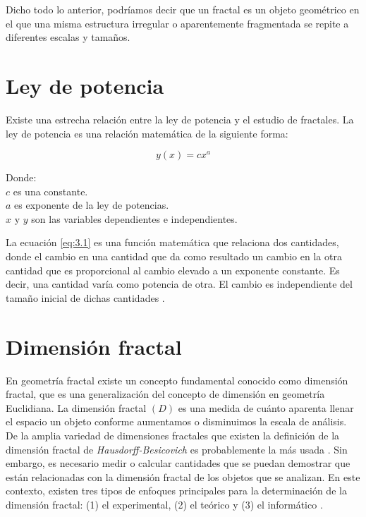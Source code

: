 Dicho todo lo anterior, podr\'{i}amos decir que un fractal es un objeto geom\'{e}trico en el que una misma estructura irregular o aparentemente fragmentada se repite a diferentes escalas y tamaños. 

\section{Ley de potencia} 

Existe una estrecha relaci\'{o}n entre la ley de potencia y el estudio de fractales. La ley de potencia es una relaci\'{o}n matem\'{a}tica de la siguiente forma:

\begin{equation}
	y(x) = cx^{a}
	\label{eq:3.1}
\end{equation}

Donde:\\
$c$ es una constante.\\
$a$ es exponente de la ley de potencias.\\
$x$ y $y$ son las variables dependientes e independientes. 

La ecuaci\'{o}n \ref{eq:3.1} es una funci\'{o}n matem\'{a}tica que relaciona dos cantidades, donde el cambio en una cantidad que da como resultado un cambio en la otra cantidad que es proporcional al cambio elevado a un exponente constante. Es decir, una cantidad var\'{i}a como potencia de otra. El cambio es independiente del tamaño inicial de dichas cantidades \cite{Meakin1998}.

\color{blue}

\section{Dimensi\'{o}n fractal}

En geometr\'{i}a fractal existe un concepto fundamental conocido como dimensi\'{o}n fractal, que es una generalizaci\'{o}n del concepto de dimensi\'{o}n en geometr\'{i}a Euclidiana. La dimensi\'{o}n fractal $(D)$ es una medida de cu\'{a}nto aparenta llenar el espacio un objeto conforme aumentamos o disminuimos la escala de an\'{a}lisis. De la  amplia variedad de dimensiones fractales que existen la definici\'{o}n de la dimensi\'{o}n fractal de \textit{Hausdorff-Besicovich} es probablemente la m\'{a}s usada \cite{Vicsek1992, Meakin1998}. Sin embargo, es necesario medir o calcular cantidades que se puedan demostrar que est\'{a}n relacionadas con la dimensi\'{o}n fractal de los objetos que se analizan. En este contexto, existen  tres tipos de enfoques principales para la determinaci\'{o}n de la dimensi\'{o}n fractal: (1) el experimental, (2) el te\'{o}rico y (3) el inform\'{a}tico \cite{Vicsek1992}.

